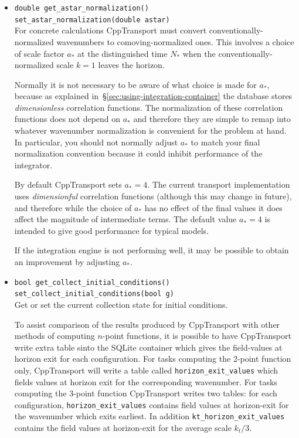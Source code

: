 \documentclass[11pt,a4paper]{article}
\newcommand{\Nstar}{N_{\ast}}
\newcommand{\astar}{a_{\ast}}
\newcommand{\packagefont}{\sffamily}
\newcommand{\CppTransport}{{\packagefont CppTransport}}
\newcommand{\SQLite}{{\packagefont SQLite}}
\begin{document}
\begin{itemize}
    \item \texttt{double get_astar_normalization()} \\
    \texttt{set_astar_normalization(double astar)} \\
    For concrete calculations {\CppTransport} must convert conventionally-normalized
    wavenumbers to comoving-normalized ones.
    This involves a choice of scale factor $\astar$ at the distinguished
    time $\Nstar$ when the conventionally-normalized scale $k=1$ leaves the
    horizon.

    Normally it is not necessary to be aware of what choice is made for
    $\astar$, because as explained in~\S\ref{sec:using-integration-container}
    the database stores \emph{dimensionless} correlation functions.
    The normalization of these correlation functions does not depend on
    $\astar$
    and therefore they are simple to remap into whatever wavenumber
    normalization is convenient for the problem at hand. In particular, you should
    not normally adjust $\astar$
    to match your final normalization convention because it could inhibit
    performance of the integrator.
     
    By default {\CppTransport} sets
    $\astar = 4$.
    The current transport implementation uses
    \emph{dimensionful} correlation
    functions (although this may change in future),
    and therefore while the choice of $\astar$ has no effect
    of the final values it does affect the magnitude of intermediate
    terms.
    The default value $\astar = 4$ is intended to give good performance
    for typical models.
    
    If the integration engine is not performing well, it may be possible
    to obtain an improvement by adjusting $\astar$.
    
    \item \texttt{bool get_collect_initial_conditions()} \\
    \texttt{set_collect_initial_conditions(bool g)} \\
    Get or set the current collection state for initial conditions.
    
    To assist comparison of the results produced by {\CppTransport} with
    other methods of computing $n$-point functions,
    it is possible to have {\CppTransport} write extra
    table sinto the {\SQLite} container which gives the field-values
    at horizon exit for each configuration.
    For tasks computing the 2-point function only,
    {\CppTransport} will write a table called
    \texttt{horizon_exit_values}
    which
    fields values at horizon exit for the corresponding wavenumber.
    For tasks computing the 3-point function {\CppTransport}
    writes two tables:
    for each configuration,
    \texttt{horizon_exit_values}
    contains field values at horizon-exit for the
    wavenumber which exits
    earliest.
    In addition \texttt{kt_horizon_exit_values}
    contains the field values at horizon-exit for the
    average scale $k_t/3$.
    

\end{itemize}
\end{document}
